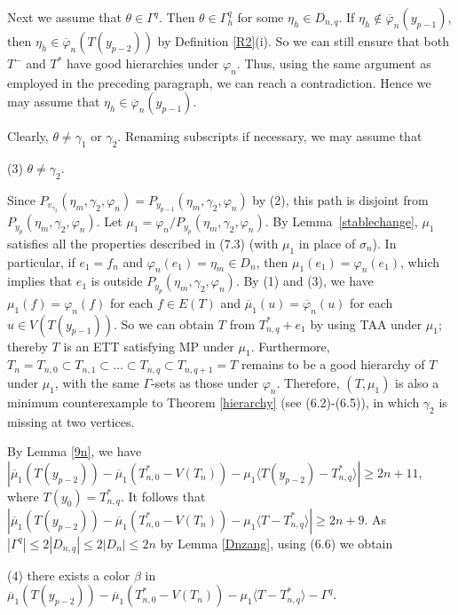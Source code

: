 \documentclass[11pt]{article}
\newcommand{\phibar}{\overline{\varphi}}
\begin{document}
Next we assume that $\theta\in\Gamma^{q}$. Then $\theta\in \Gamma^{q}_h$ for some $\eta_h \in D_{n,q}$. 
If $\eta_h\notin \overline{\varphi}_n(y_{p-1})$, then $\eta_h \in\overline{\varphi}_n(T(y_{p-2}))$ by
Definition \ref{R2}(i). So we can still ensure that both $T^-$ and $T^*$ have good 
hierarchies under $\varphi_n$. Thus, using the same argument as employed in the preceding paragraph, we can  
reach a contradiction. Hence we may assume that $\eta_h\in \overline{\varphi}_n(y_{p-1})$.

Clearly, $\theta \ne \gamma_{1}$ or $\gamma_{2}$. Renaming subscripts if necessary, we may assume that 

(3) $\theta \ne \gamma_2$.

\noindent Since $P_{v_{\gamma_2}}(\eta_m, \gamma_{2},\varphi_n)=P_{y_{p-1}}(\eta_m,\gamma_{2},\varphi_n)$ by (2), this 
path is disjoint from $P_{y_{p}}(\eta_m,\gamma_{2},\varphi_n)$. Let $\mu_1 = \varphi_n/P_{y_{p}}(\eta_m,\gamma_2,\varphi_n)$.
By Lemma~\ref{stablechange},  $\mu_1$ satisfies all the properties described in (7.3) (with $\mu_1$ in place of
$\sigma_n$).  In particular, if $e_1=f_n$ and $\varphi_n(e_1)=\eta_m \in D_n$, then $\mu_1(e_1)=\varphi_n(e_1)$, which 
implies that $e_1$ is outside $P_{y_{p}}(\eta_m,\gamma_2,\varphi_n)$. 
By (1) and (3), we have $\mu_1(f)=\varphi_n(f)$ for each $f\in E(T)$ and $\overline{\mu}_1(u)= 
\phibar_n(u)$ for each $u\in V(T(y_{p-1}))$. So we can obtain $T$ from $T_{n,q}^*+e_1$ by using TAA under $\mu_1$; thereby 
$T$ is an ETT satisfying MP under $\mu_1$. Furthermore, $T_n=T_{n,0} \subset T_{n,1} \subset \ldots \subset T_{n,q} 
\subset T_{n,q+1}=T$ remains to be a good hierarchy of $T$ under $\mu_1$, with the same $\Gamma$-sets as those under $\varphi_n$. Therefore, $(T, \mu_1)$ is also a minimum counterexample to Theorem \ref{hierarchy} (see (6.2)-(6.5)), in which $\gamma_2$ is missing at two vertices.

By Lemma \ref{9n}, we have 
$|\overline{\mu}_1(T(y_{p-2}))- \overline{\mu}_1(T_{n,0}^*-V(T_n)) - \mu_1 \langle T(y_{p-2}) - T_{n,q}^* \rangle | 
\geq 2n+11$, where $T(y_0)=T_{n,q}^*$. It follows that $|\overline{\mu}_1(T(y_{p-2}))- \overline{\mu}_1(T_{n,0}^*-V(T_n)) 
- \mu_1 \langle T - T_{n,q}^* \rangle | \geq 2n+9$. As $|\Gamma^{q}|\le 2 |D_{n,q}| \le 2|D_n| \le 2n$ by Lemma \ref{Dnzang},
using (6.6) we obtain 

(4) there exists a color $\beta$ in $\overline{\mu}_1(T(y_{p-2}))- \overline{\mu}_1(T_{n,0}^*-V(T_n))- 
\mu_1 \langle T - T_{n,q}^* \rangle- \Gamma^{q}$.  
\end{document}
